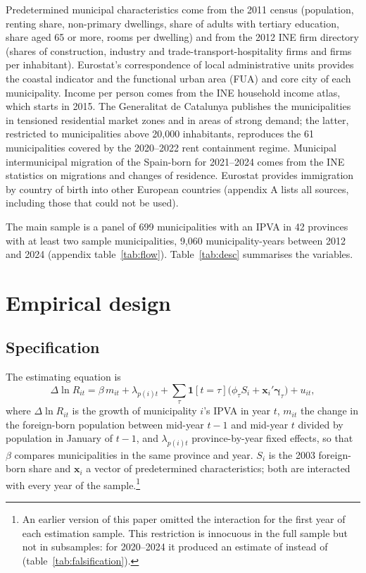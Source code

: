 \documentclass[11pt,a4paper]{article}
\begin{document}
Predetermined municipal characteristics come from the 2011 census (population, renting share, non-primary dwellings, share of adults with tertiary education, share aged 65 or more, rooms per dwelling) and from the 2012 INE firm directory (shares of construction, industry and trade-transport-hospitality firms and firms per inhabitant). Eurostat's correspondence of local administrative units provides the coastal indicator and the functional urban area (FUA) and core city of each municipality. Income per person comes from the INE household income atlas, which starts in 2015. The Generalitat de Catalunya publishes the municipalities in tensioned residential market zones and in areas of strong demand; the latter, restricted to municipalities above 20,000 inhabitants, reproduces the 61 municipalities covered by the 2020--2022 rent containment regime. Municipal intermunicipal migration of the Spain-born for 2021--2024 comes from the INE statistics on migrations and changes of residence. Eurostat provides immigration by country of birth into other European countries (appendix A lists all sources, including those that could not be used).

The main sample is a panel of 699 municipalities with an IPVA in 42 provinces with at least two sample municipalities, 9,060 municipality-years between 2012 and 2024 (appendix table~\ref{tab:flow}). Table~\ref{tab:desc} summarises the variables.



\section{Empirical design}\label{sec:empirics}

\subsection{Specification}

The estimating equation is
\begin{equation}\label{eq:main}
\Delta\ln R_{it}=\beta\, m_{it}+\lambda_{p(i)t}+\sum_{\tau}\mathbf{1}[t=\tau]\big(\phi_\tau S_i+\mathbf{x}_i'\boldsymbol\gamma_\tau\big)+u_{it},
\end{equation}
where $\Delta\ln R_{it}$ is the growth of municipality $i$'s IPVA in year $t$, $m_{it}$ the change in the foreign-born population between mid-year $t-1$ and mid-year $t$ divided by population in January of $t-1$, and $\lambda_{p(i)t}$ province-by-year fixed effects, so that $\beta$ compares municipalities in the same province and year. $S_i$ is the 2003 foreign-born share and $\mathbf{x}_i$ a vector of predetermined characteristics; both are interacted with every year of the sample.\footnote{An earlier version of this paper omitted the interaction for the first year of each estimation sample. This restriction is innocuous in the full sample but not in subsamples: for 2020--2024 it produced an estimate of \wTwoZeroTwoFourold{} instead of \wTwoZeroTwoFour{} (table~\ref{tab:falsification}).}
\end{document}
